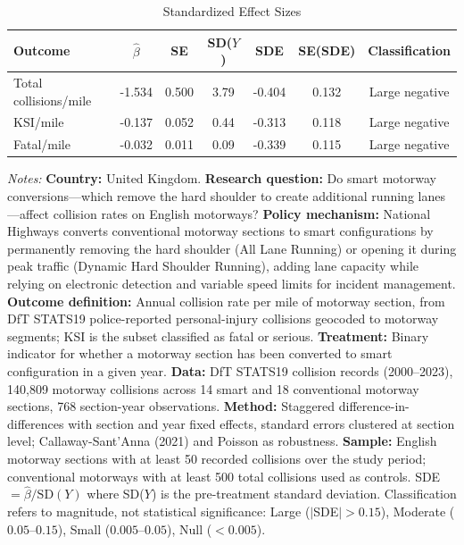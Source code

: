 \begin{table}[htbp]
\centering
\caption{Standardized Effect Sizes}
\label{tab:sde}
\small
\begin{tabular}{lcccccc}
\toprule
 Outcome & $\hat{\beta}$ & SE & SD($Y$) & SDE & SE(SDE) & Classification \\
\midrule
  Total collisions/mile & -1.534 & 0.500 & 3.79 & -0.404 & 0.132 & Large negative \\
  KSI/mile & -0.137 & 0.052 & 0.44 & -0.313 & 0.118 & Large negative \\
  Fatal/mile & -0.032 & 0.011 & 0.09 & -0.339 & 0.115 & Large negative \\
\bottomrule
\end{tabular}
\begin{tablenotes}
\item \textit{Notes:} \textbf{Country:} United Kingdom. \textbf{Research question:} Do smart motorway conversions---which remove the hard shoulder to create additional running lanes---affect collision rates on English motorways? \textbf{Policy mechanism:} National Highways converts conventional motorway sections to smart configurations by permanently removing the hard shoulder (All Lane Running) or opening it during peak traffic (Dynamic Hard Shoulder Running), adding lane capacity while relying on electronic detection and variable speed limits for incident management. \textbf{Outcome definition:} Annual collision rate per mile of motorway section, from DfT STATS19 police-reported personal-injury collisions geocoded to motorway segments; KSI is the subset classified as fatal or serious. \textbf{Treatment:} Binary indicator for whether a motorway section has been converted to smart configuration in a given year. \textbf{Data:} DfT STATS19 collision records (2000--2023), 140,809 motorway collisions across 14 smart and 18 conventional motorway sections, 768 section-year observations. \textbf{Method:} Staggered difference-in-differences with section and year fixed effects, standard errors clustered at section level; Callaway-Sant'Anna (2021) and Poisson as robustness. \textbf{Sample:} English motorway sections with at least 50 recorded collisions over the study period; conventional motorways with at least 500 total collisions used as controls. SDE $= \hat{\beta} / \text{SD}(Y)$ where SD($Y$) is the pre-treatment standard deviation. Classification refers to magnitude, not statistical significance: Large ($|$SDE$| > 0.15$), Moderate ($0.05$--$0.15$), Small ($0.005$--$0.05$), Null ($< 0.005$).
\end{tablenotes}
\end{table}

